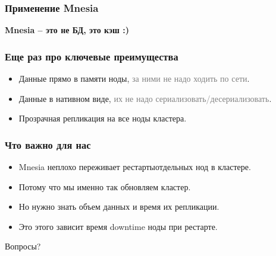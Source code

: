 \documentclass[10pt]{beamer}
\begin{document}
\begin{frame}
\frametitle{Применение Mnesia}
\centering
\textbf{Mnesia -- это не БД, это кэш :)}
\end{frame}

\begin{frame}
\frametitle{Еще раз про ключевые преимущества}
\begin{itemize}
\item Данные прямо в памяти ноды,\newline
  \textcolor{gray}{за ними не надо ходить по сети}.
\item Данные в нативном виде,\newline
  \textcolor{gray}{их не надо сериализовать/десериализовать}.
\item Прозрачная репликация на все ноды кластера.
\end{itemize}
\end{frame}

\begin{frame}
\frametitle{Что важно для нас}
\begin{itemize}
\item Mnesia неплохо переживает рестарты\newline отдельных нод в кластере.
\item Потому что мы именно так обновляем кластер.
\item Но нужно знать объем данных и время их репликации.
\item Это этого зависит время downtime ноды при рестарте.
\end{itemize}
\end{frame}

\begin{frame}
\centering
Вопросы?
\end{frame}
\end{document}

